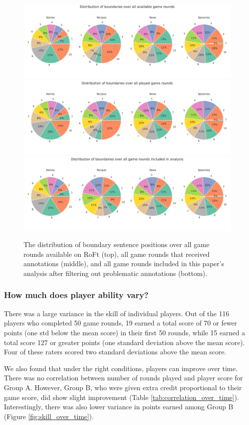 \begin{figure}
    \centering
    \includegraphics[width=0.8\linewidth]{figures/available_game_rounds.pdf}
    \includegraphics[width=0.8\linewidth]{figures/played_game_rounds.pdf}
    \includegraphics[width=0.8\linewidth]{figures/analyzed_game_rounds.pdf}
    \caption{The distribution of boundary sentence positions over all game rounds available on RoFt (top), all game rounds that received annotations (middle), and all game rounds included in this paper's analysis after filtering out problematic annotations (bottom).}
    \label{fig:distribution_true_boundaries}
\end{figure}

\subsubsection{How much does player ability vary?}
There was a large variance in the skill of individual players.
Out of the 116 players who completed 50 game rounds, 19 earned a total score of 70 or fewer points (one std below the mean score) in their first 50 rounds, while 15 earned a total score 127 or greater points (one standard deviation above the mean score). Four of these raters scored two standard deviations above the mean score.

We also found that under the right conditions, players can improve over time.
There was no correlation between number of rounds played and player score for Group A.
However, Group B, who were given extra credit proportional to their game score, did show slight improvement (Table \ref{tab:correlation_over_time}). 
Interestingly, there was also lower variance in points earned among Group B (Figure \ref{fig:skill_over_time}).

